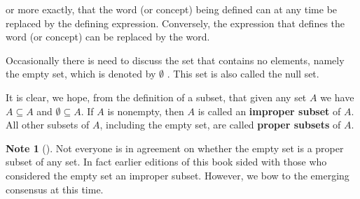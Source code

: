 \documentclass[10pt,]{book}
\newcommand{\terminology}[1]{\textbf{#1}}
\theoremstyle{plain}
\theoremstyle{definition}
\theoremstyle{definition}
\newtheorem{note}[theorem]{Note}
\theoremstyle{definition}
\theoremstyle{definition}
\begin{document}
or more exactly, that the word (or concept) being defined can at any time be replaced by the defining expression. Conversely, the expression that
defines the word (or concept) can be replaced by the word. %
\par
Occasionally there is need to discuss the set that contains no elements, namely the empty set, which is denoted by \(\emptyset\)\label{notation-5}
.
This set is also called the null set.%
\par
It is clear, we hope, from the definition of a subset, that given any set \( A\) we have \(A\subseteq A\) and \(\emptyset \subseteq A\). If \(A\) is nonempty, then 
 \(A\) is called an \terminology{improper subset} of \(A\).  All other subsets of \(A\), including the empty set, are called \terminology{proper subsets } of \(A\). %
\begin{note}[]\label{note-1}
Not everyone is in agreement on whether the empty set is a proper subset of any set.  In fact earlier editions of this book sided with those who considered the empty set an improper subset.  However, we bow to the emerging consensus at this time.%
\end{note}
\typeout{************************************************}
\typeout{************************************************}
\end{document}
